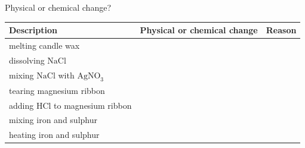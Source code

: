 \begin{Investigation}{Physical or chemical change? }
          \begin{table}[H]
        \begin{center}
      \label{m38709*id63990}
      \begin{tabular}{|l|l|l|}\hline
                  \textbf{Description}
                 &
                  \textbf{Physical or chemical change}
                 &
                  \textbf{Reason} \\ \hline
        melting candle wax &
         &
        \\ \hline
        dissolving $\mathrm{NaCl}$ &
         &
      \\ \hline
        mixing $\mathrm{NaCl}$ with ${\mathrm{AgNO}}_{3}$ &
         &
        \\ \hline
        tearing magnesium ribbon &
         &
       \\ \hline
        adding $\mathrm{HCl}$ to magnesium ribbon &
         &
        \\ \hline
        mixing iron and sulphur &
         &
        \\ \hline
        heating iron and sulphur &
         &
        \\ \hline
    \end{tabular}
      \end{center}
\end{table}
    \par
  \par 
\end{Investigation}
    \label{m38711*cid4}
